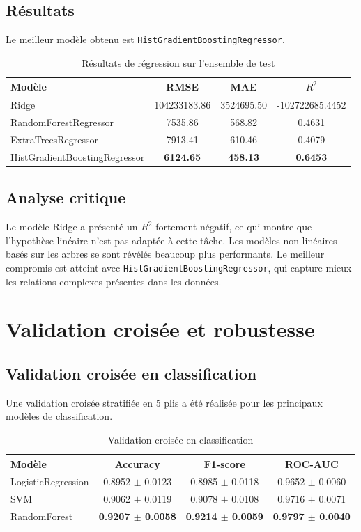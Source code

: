 \documentclass[11pt,a4paper]{article}
\begin{document}
\subsection{Résultats}
Le meilleur modèle obtenu est \texttt{HistGradientBoostingRegressor}.

\begin{table}[H]
\centering
\caption{Résultats de régression sur l’ensemble de test}
\begin{tabular}{lccc}
\toprule
\textbf{Modèle} & \textbf{RMSE} & \textbf{MAE} & \textbf{\(R^2\)} \\
\midrule
Ridge & 104233183.86 & 3524695.50 & -102722685.4452 \\
RandomForestRegressor & 7535.86 & 568.82 & 0.4631 \\
ExtraTreesRegressor & 7913.41 & 610.46 & 0.4079 \\
HistGradientBoostingRegressor & \textbf{6124.65} & \textbf{458.13} & \textbf{0.6453} \\
\bottomrule
\end{tabular}
\end{table}

\subsection{Analyse critique}
Le modèle Ridge a présenté un \(R^2\) fortement négatif, ce qui montre que l’hypothèse linéaire n’est pas adaptée à cette tâche. Les modèles non linéaires basés sur les arbres se sont révélés beaucoup plus performants. Le meilleur compromis est atteint avec \texttt{HistGradientBoostingRegressor}, qui capture mieux les relations complexes présentes dans les données.

\section{Validation croisée et robustesse}

\subsection{Validation croisée en classification}
Une validation croisée stratifiée en 5 plis a été réalisée pour les principaux modèles de classification.

\begin{table}[H]
\centering
\caption{Validation croisée en classification}
\begin{tabular}{lccc}
\toprule
\textbf{Modèle} & \textbf{Accuracy} & \textbf{F1-score} & \textbf{ROC-AUC} \\
\midrule
LogisticRegression & 0.8952 $\pm$ 0.0123 & 0.8985 $\pm$ 0.0118 & 0.9652 $\pm$ 0.0060 \\
SVM & 0.9062 $\pm$ 0.0119 & 0.9078 $\pm$ 0.0108 & 0.9716 $\pm$ 0.0071 \\
RandomForest & \textbf{0.9207 $\pm$ 0.0058} & \textbf{0.9214 $\pm$ 0.0059} & \textbf{0.9797 $\pm$ 0.0040} \\
\bottomrule
\end{tabular}
\end{table}
\end{document}
